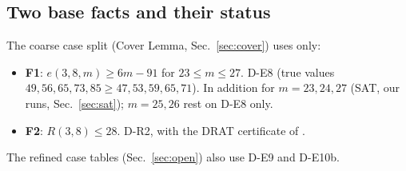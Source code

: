 \subsection{Two base facts and their status}\label{sec:basefacts}
The coarse case split (Cover Lemma, Sec.~\ref{sec:cover}) uses only:
\begin{itemize}
\item \textbf{F1}: $e(3,8,m) \ge 6m - 91$ for $23 \le m \le 27$.  D-E8 (true values $49, 56, 65, 73, 85 \ge 47, 53, 59,
  65, 71$). In addition  for $m = 23, 24, 27$ (SAT, our runs, Sec.~\ref{sec:sat}); $m = 25, 26$ rest on D-E8 only.
\item \textbf{F2}: $R(3,8) \le 28$.  D-R2, with the DRAT certificate of \cite{DuLBG}.
\end{itemize}
The refined case tables (Sec.~\ref{sec:open}) also use D-E9 and D-E10b.
